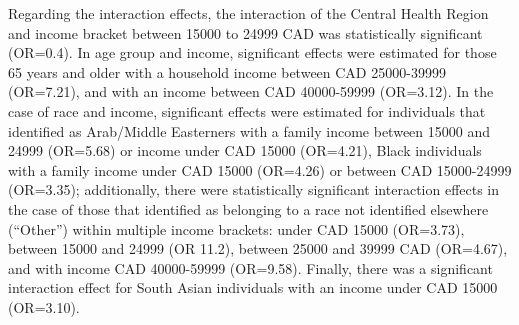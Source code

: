 \documentclass[
  letterpaper,
  DIV=11,
  numbers=noendperiod]{scrartcl}
\begin{document}
Regarding the interaction effects, the interaction of the Central Health
Region and income bracket between 15000 to 24999 CAD was statistically
significant (OR=0.4). In age group and income, significant effects were
estimated for those 65 years and older with a household income between
CAD 25000-39999 (OR=7.21), and with an income between CAD 40000-59999
(OR=3.12). In the case of race and income, significant effects were
estimated for individuals that identified as Arab/Middle Easterners with
a family income between 15000 and 24999 (OR=5.68) or income under CAD
15000 (OR=4.21), Black individuals with a family income under CAD 15000
(OR=4.26) or between CAD 15000-24999 (OR=3.35); additionally, there were
statistically significant interaction effects in the case of those that
identified as belonging to a race not identified elsewhere (``Other'')
within multiple income brackets: under CAD 15000 (OR=3.73), between
15000 and 24999 (OR 11.2), between 25000 and 39999 CAD (OR=4.67), and
with income CAD 40000-59999 (OR=9.58). Finally, there was a significant
interaction effect for South Asian individuals with an income under CAD
15000 (OR=3.10).
\end{document}
